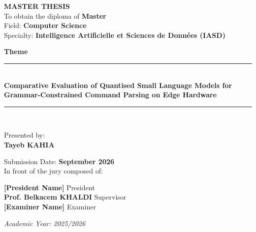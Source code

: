 \begin{titlepage}


\vspace{0.5cm}
{\Large \textbf{MASTER THESIS}}\\

\vspace{0.4cm}
{\large To obtain the diploma of \textbf{Master}\\}
{\large Field: \textbf{Computer Science}\\}
{\large Specialty: \textbf{Intelligence Artificielle et Sciences de Données (IASD)}\\}

\vspace{0.4cm}
{\Large \textbf{Theme}}\\
\rule{15cm}{0.2mm}\\
\vspace{0.4cm}
{\textbf{\large Comparative Evaluation of Quantised Small Language Models for
Grammar-Constrained Command Parsing on Edge Hardware}}\\
\rule{15cm}{0.2mm}\\
\vspace{0.2cm}

{\large Presented by:}\\
\vspace{0.2cm}
{\large \textbf{Tayeb KAHIA}}

\vspace{0.4cm}
{\large Submission Date: \textbf{September 2026}\\
In front of the jury composed of:}
\vspace{0.2cm}
\begin{center}
    {\large \textbf{[President Name]} \hfill President\\}
    {\large \textbf{Prof. Belkacem KHALDI} \hfill Supervisor\\}
    {\large \textbf{[Examiner Name]} \hfill Examiner\\}
\end{center}

\vspace{0.5cm}
{\normalsize \textit{Academic Year: 2025/2026}}
\end{titlepage}
